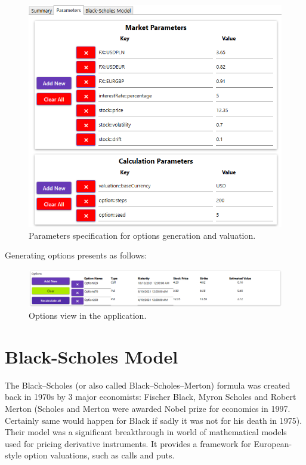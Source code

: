    \begin{figure}[H]
            \centering
            \includegraphics[width=\textwidth]{img/specifyParameters.png}
            \caption{Parameters specification for options generation and valuation.}
            \label{fig:parametersPresentation}
    \end{figure}
    Generating options presents as follows:
    \begin{figure}[H]
            \centering
            \includegraphics[width=\textwidth]{img/optionsPresentation.png}
            \caption{Options view in the application.}
            \label{fig:optionsPresentation}
    \end{figure}
\section{Black-Scholes Model}
    The Black--Scholes (or also called Black--Scholes--Merton) formula was created back in 1970s by 3 major economists: Fischer Black, Myron Scholes and Robert Merton (Scholes and Merton were awarded Nobel prize for economics in 1997. Certainly same would happen for Black if sadly it was not for his death in 1975).
    Their model was a significant breakthrough in world of mathematical models used for pricing derivative instruments. It provides a framework for European-style option valuations, such as calls and puts.
    
